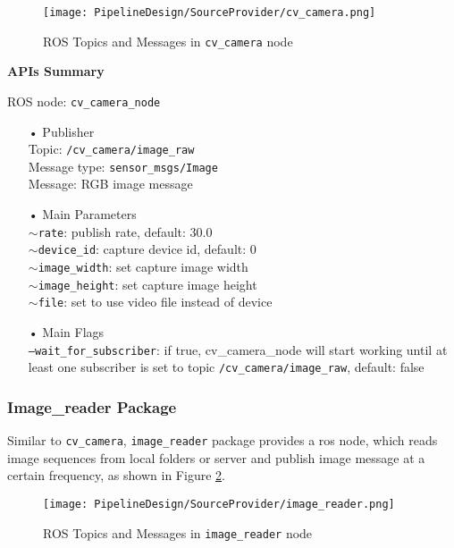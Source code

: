 \begin{figure}[h!]
  \centering
  \texttt{[image: PipelineDesign/SourceProvider/cv\_camera.png]}
  \caption{ROS Topics and Messages in \texttt{cv\_camera} node}
  \label{fig:cv_camera_topics}
\end{figure}

\textbf{APIs Summary}

ROS node: \texttt{cv\_camera\_node}

\begin{itemize}
\item[•] Publisher \\
Topic: \texttt{/cv\_camera/image\_raw} \\
Message type: \texttt{sensor\_msgs/Image} \\
Message: RGB image message 

\item[•] Main Parameters \\
\texttt{$\sim$rate}: publish rate, default: 30.0 \\
\texttt{$\sim$device\_id}: capture device id, default: 0 \\
\texttt{$\sim$image\_width}: set capture image width \\
\texttt{$\sim$image\_height}: set capture image height \\
\texttt{$\sim$file}: set to use video file instead of device \\

\item[•] Main Flags \\
\texttt{---wait\_for\_subscriber}: if true, cv\_camera\_node will start working until at least one subscriber is set to topic \texttt{/cv\_camera/image\_raw}, default: false
\end{itemize}

\subsubsection{Image\_reader Package}

Similar to \texttt{cv\_camera}, \texttt{image\_reader} package provides a ros node, which reads image sequences from local folders or server and publish image message at a certain frequency, as shown in Figure \ref{fig:image_reader_topics}.

\begin{figure}[h!]
  \centering
  \texttt{[image: PipelineDesign/SourceProvider/image\_reader.png]}
  \caption{ROS Topics and Messages in \texttt{image\_reader} node}
  \label{fig:image_reader_topics}
\end{figure}


